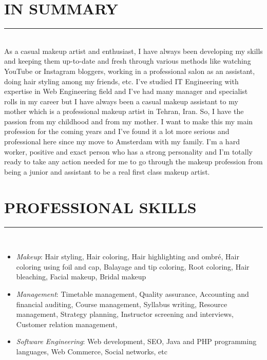 \documentclass[10pt,a4paper]{article}
\begin{document}
\thispagestyle{fancy}

\hfill \break
\section{IN SUMMARY}
\noindent \rule {3.3cm}{0.4pt} \\
\onehalfspacing
As a casual makeup artist and enthusiast, I have always been developing my skills and keeping them up-to-date and fresh through various methods like watching YouTube or Instagram bloggers, working in a professional salon as an assistant, doing hair styling among my friends, etc. I've studied IT Engineering with expertise in Web Engineering field and I've had many manager and specialist rolls in my career but I have always been a casual makeup assistant to my mother which is a professional makeup artist in Tehran, Iran. So, I have the passion from my childhood and from my mother. I want to make this my main profession for the coming years and I've found it a lot more serious and professional here since my move to Amsterdam with my family. I'm a hard worker, positive and exact person who has a strong personality and I'm totally ready to take any action needed for me to go through the makeup profession from being a junior and assistant to be a real first class makeup artist.

\section{PROFESSIONAL SKILLS}
\noindent \rule {5.6cm}{0.4pt} \\
\begin{itemize}
  \setlength{\rightskip}{2cm}
  \setlength\itemsep{0em}
  \item \small \textit{Makeup}:
  Hair styling, Hair coloring, Hair highlighting and ombr\'e, Hair coloring using foil and cap, Balayage and tip coloring, Root coloring, Hair bleaching, Facial makeup, Bridal makeup
  \item \small \textit {Management}:
  Timetable management, Quality assurance, Accounting and financial auditing, Course management, Syllabus writing, Resource management, Strategy planning, Instructor screening and interviews, Customer relation management, 
  \item \small \textit {Software Engineering}: 
  Web development, SEO, Java and PHP programming languages, Web Commerce, Social networks, etc
\end{itemize}
\end{document}
